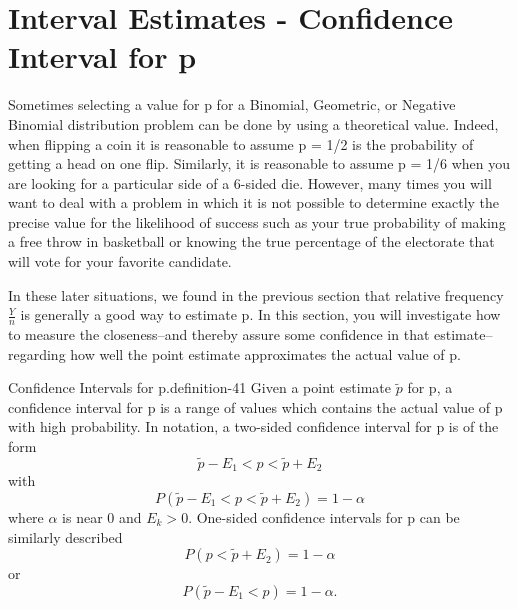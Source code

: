 \documentclass[10pt,]{book}
\numberwithin{equation}{section}
\newcommand{\lt}{<}
\newcommand{\gt}{>}
\begin{document}
\section[{Interval Estimates - Confidence Interval for p}]{Interval Estimates - Confidence Interval for p}\label{section-68}
\hypertarget{p-1339}{}%
Sometimes selecting a value for p for a Binomial, Geometric, or Negative Binomial distribution problem can be done by using a theoretical value. Indeed, when flipping a coin it is reasonable to assume p = 1/2 is the probability of getting a head on one flip. Similarly, it is reasonable to assume p = 1/6 when you are looking for a particular side of a 6-sided die. However, many times you will want to deal with a problem in which it is not possible to determine exactly the precise value for the likelihood of success such as your true probability of making a free throw in basketball or knowing the true percentage of the electorate that will vote for your favorite candidate.%
\par
\hypertarget{p-1340}{}%
In these later situations, we found in the previous section that relative frequency \(\frac{Y}{n}\) is generally a good way to estimate p. In this section, you will investigate how to measure the closeness--and thereby assure some confidence in that estimate--regarding how well the point estimate approximates the actual value of p.%
\par
\hypertarget{p-1341}{}%
\begin{definition}{Confidence Intervals for p.}{definition-41}%
\hypertarget{p-1342}{}%
Given a point estimate \(\tilde{p}\) for p, a confidence interval for p is a range of values which contains the actual value of p with high probability. In notation, a two-sided confidence interval for p is of the form%
\begin{equation*}
\tilde{p} - E_1 \lt p \lt \tilde{p} + E_2
\end{equation*}
with%
\begin{equation*}
P(\tilde{p} - E_1 \lt p \lt \tilde{p} + E_2) = 1 - \alpha
\end{equation*}
where \(\alpha\) is near 0 and \(E_k \gt 0\).  One-sided confidence intervals for p can be similarly described%
\begin{equation*}
P( p \lt \tilde{p} + E_2) = 1 - \alpha
\end{equation*}
or%
\begin{equation*}
P(\tilde{p} - E_1 \lt p) = 1 - \alpha.
\end{equation*}
%
\end{definition}
\end{document}
